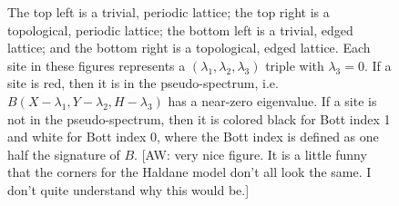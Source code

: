 \documentclass[a4paper]{article}
\newcommand{\aw}[1]{{\color{blue} [AW: #1]}}
\begin{document}
\begin{figure}
\centering
{}%
%

%
%
\caption{The top left is a trivial, periodic lattice; the top right is a topological, periodic lattice; the bottom left is a trivial, edged lattice; and the bottom right is a topological, edged lattice.
Each site in these figures represents a $(\lambda_1,\lambda_2,\lambda_3)$ triple with $\lambda_3 = 0$.
If a site is red, then it is in the pseudo-spectrum, i.e. $B(X - \lambda_1, Y - \lambda_2, H - \lambda_3)$ has a near-zero eigenvalue.
If a site is not in the pseudo-spectrum, then it is colored black for Bott index 1 and white for Bott index 0, where the Bott index is defined as one half the signature of $B$. \aw{very nice figure. It is a little funny that the corners for the Haldane model don't all look the same. I don't quite understand why this would be.} \\
}%
\label{fig:Bott Haldane}%
\end{figure}
\end{document}

